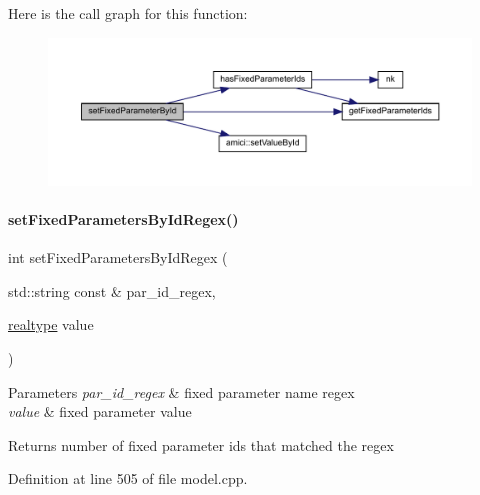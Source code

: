 Here is the call graph for this function\+:
\nopagebreak
\begin{figure}[H]
\begin{center}
\leavevmode
\includegraphics[width=350pt]{classamici_1_1_model_adc0d24343c6fed2e797fb402f7c2d256_cgraph}
\end{center}
\end{figure}
\mbox{\label{classamici_1_1_model_acda9b9debfd3d6ac77e2d27a48bfb5d6}} 
\paragraph{\texorpdfstring{set\+Fixed\+Parameters\+By\+Id\+Regex()}{setFixedParametersByIdRegex()}}
{\footnotesize\ttfamily int set\+Fixed\+Parameters\+By\+Id\+Regex (\begin{DoxyParamCaption}\item[{std\+::string const \&}]{par\+\_\+id\+\_\+regex,  }\item[{\mbox{\hyperlink{namespaceamici_a1bdce28051d6a53868f7ccbf5f2c14a3}{realtype}}}]{value }\end{DoxyParamCaption})}


\begin{DoxyParams}{Parameters}
{\em par\+\_\+id\+\_\+regex} & fixed parameter name regex \\
\hline
{\em value} & fixed parameter value \\
\hline
\end{DoxyParams}
\begin{DoxyReturn}{Returns}
number of fixed parameter ids that matched the regex 
\end{DoxyReturn}


Definition at line 505 of file model.\+cpp.

